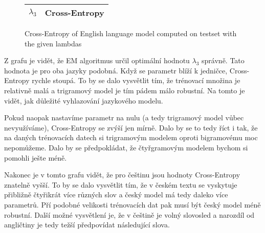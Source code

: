\documentclass[11pt]{article}
\begin{document}
\begin{figure}
    \begin{center}
    \begin{tabular}{|l|c|}
        \hline
        $\lambda_3$ & Cross-Entropy \\
        \hline
        
        \hline
    \end{tabular}
    \end{center}
    \caption{Cross-Entropy of English language model computed on testset with the given lambdas}
    \label{results-model-EN}
\end{figure}

Z grafu je vidět, že EM algoritmus určil optimální hodnotu $\lambda_3$ správně. Tato hodnota je pro oba jazyky podobná. 
Když se parametr blíží k jedničce, Cross-Entropy rychle stoupá. To by se dalo vysvětlit tím, že trénovací množina je relativně
malá a trigramový model je tím pádem málo robustní. Na tomto je vidět, jak důležité vyhlazování jazykového modelu.

Pokud naopak nastavíme parametr na nulu (a tedy trigramový model
vůbec nevyužíváme), Cross-Entropy se zvýší jen mírně. Dalo by se to tedy říct i tak, že na daných trénovacích datech si trigramovým
modelem oproti bigramovému moc nepomůžeme. Dalo by se předpokládat, že čtyřgramovým modelem bychom si pomohli ješte méně.

Nakonec je v tomto grafu vidět, že pro češtinu jsou hodnoty Cross-Entropy znatelně vyšší. To by se dalo vysvětlit tím, že v českém 
textu se vyskytuje přibližně čtyřikrát více různých slov a český model má tedy daleko více parametrů. Pří podobné velikosti trénovacích
dat pak musí být český model méně robustní. Další možné vysvětlení je, že v češtině je volný slovosled a narozdíl od angličtiny je tedy
težší předpovídat následující slova.
\end{document}
